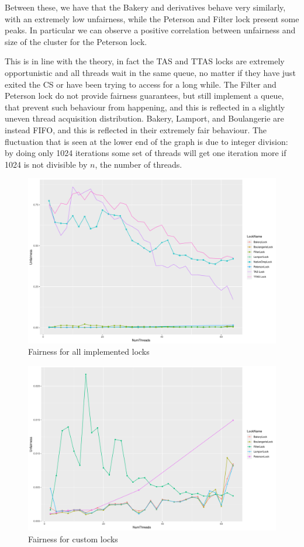 Between these, we have that the Bakery and derivatives behave very similarly, with
an extremely low unfairness, while the Peterson and Filter lock present some peaks.
In particular we can observe a positive correlation between unfairness and size of
the cluster for the Peterson lock.

This is in line with the theory, in fact the TAS and TTAS locks are extremely
opportunistic and all threads wait in the same queue, no matter if they have
just exited the CS or have been trying to access for a long while.
The Filter and Peterson lock do not provide fairness guarantees, but still
implement a queue, that prevent such behaviour from happening, and this is
reflected in a slightly uneven thread acquisition distribution.
Bakery, Lamport, and Boulangerie are instead FIFO, and this is reflected in
their extremely fair behaviour. The fluctuation that is seen at the lower end
of the graph is due to integer division: by doing only 1024 iterations some
set of threads will get one iteration more if 1024 is not divisible by $n$, the 
number of threads.

\begin{figure}[H]
  \includegraphics[width=\textwidth]{fig/fairness_all}
  \caption{Fairness for all implemented locks}
  \label{fig:fairness-all}
\end{figure}

\begin{figure}[H]
  \includegraphics[width=\textwidth]{fig/fairness_no_tas}
  \caption{Fairness for custom locks}
  \label{fig:fairness-no-tas}
\end{figure}
